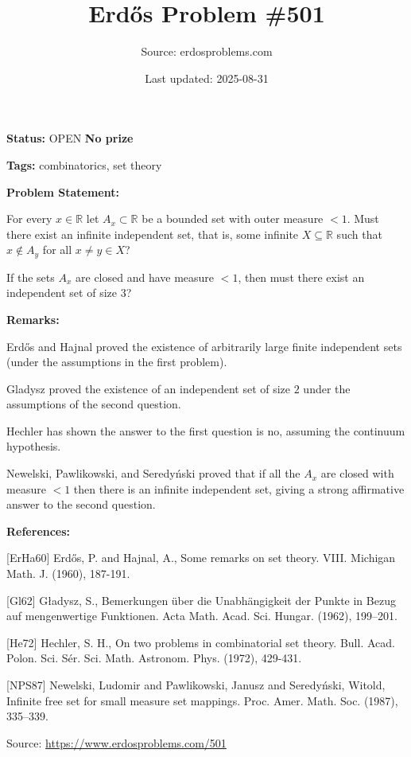 \documentclass{article}
\title{Erd\H{o}s Problem \#501}
\date{Last updated: 2025-08-31}
\author{Source: erdosproblems.com}
\begin{document}
\maketitle

\noindent\textbf{Status:} OPEN \quad \textbf{No prize}

\noindent\textbf{Tags:} combinatorics, set theory

\medskip
\noindent\textbf{Problem Statement:}

For every $x\in\mathbb{R}$ let $A_x\subset \mathbb{R}$ be a bounded set with outer measure $<1$. Must there exist an infinite independent set, that is, some infinite $X\subseteq \mathbb{R}$ such that $x\not\in A_y$ for all $x\neq y\in X$?

If the sets $A_x$ are closed and have measure $<1$, then must there exist an independent set of size $3$?

\bigskip
\noindent\textbf{Remarks:}

Erd\H{o}s and Hajnal \cite{ErHa60} proved the existence of arbitrarily large finite independent sets (under the assumptions in the first problem). 

Gladysz \cite{Gl62} proved the existence of an independent set of size $2$ under the assumptions of the second question.

Hechler \cite{He72} has shown the answer to the first question is no, assuming the continuum hypothesis.

Newelski, Pawlikowski, and Seredy\'{n}ski \cite{NPS87} proved that if all the $A_x$ are closed with measure $<1$ then there is an infinite independent set, giving a strong affirmative answer to the second question.

\bigskip
\noindent\textbf{References:}

[ErHa60] Erd\H{o}s, P. and Hajnal, A., Some remarks on set theory. VIII. Michigan Math. J. (1960), 187-191.
 
 [Gl62] G\l adysz, S., Bemerkungen \"uber die {U}nabh\"{a}ngigkeit der {P}unkte in
{B}ezug auf mengenwertige {F}unktionen. Acta Math. Acad. Sci. Hungar. (1962), 199--201.
 
 [He72] Hechler, S. H., On two problems in combinatorial set theory. Bull. Acad. Polon. Sci. S\'{e}r. Sci. Math. Astronom. Phys. (1972), 429-431.
 
 [NPS87] Newelski, Ludomir and Pawlikowski, Janusz and Seredy\'nski,
Witold, Infinite free set for small measure set mappings. Proc. Amer. Math. Soc. (1987), 335--339.

\bigskip
\noindent\small{Source: \url{https://www.erdosproblems.com/501}}
\end{document}
